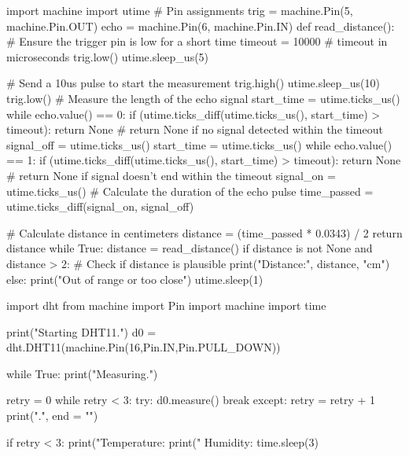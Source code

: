 \documentclass[12pt]{article} %
\begin{document}
\begin{pythoncode}[caption={HCSR04 Ultrasonic Sensor Python Test Code}]
import machine
import utime
# Pin assignments
trig = machine.Pin(5, machine.Pin.OUT)
echo = machine.Pin(6, machine.Pin.IN)
def read_distance():
    # Ensure the trigger pin is low for a short time
    timeout = 10000  # timeout in microseconds
    trig.low()
    utime.sleep_us(5)

    # Send a 10us pulse to start the measurement
    trig.high()
    utime.sleep_us(10)
    trig.low()
    # Measure the length of the echo signal
    start_time = utime.ticks_us()
    while echo.value() == 0:
        if (utime.ticks_diff(utime.ticks_us(), start_time) > timeout):
            return None  # return None if no signal detected within the timeout
    signal_off = utime.ticks_us()
    start_time = utime.ticks_us()
    while echo.value() == 1:
        if (utime.ticks_diff(utime.ticks_us(), start_time) > timeout):
            return None  # return None if signal doesn't end within the timeout
    signal_on = utime.ticks_us()
    # Calculate the duration of the echo pulse
    time_passed = utime.ticks_diff(signal_on, signal_off)

    # Calculate distance in centimeters
    distance = (time_passed * 0.0343) / 2
    return distance
while True:
    distance = read_distance()
    if distance is not None and distance > 2:  # Check if distance is plausible
        print("Distance:", distance, "cm")
    else:
        print("Out of range or too close")
    utime.sleep(1)
\end{pythoncode}
\pagebreak
\begin{pythoncode}[caption={DHT-22 Sensor Test Code}]
import dht
from machine import Pin
import machine
import time

print("Starting DHT11.")
d0 = dht.DHT11(machine.Pin(16,Pin.IN,Pin.PULL_DOWN))


while True:
    print("Measuring.")
    
    retry = 0
    while retry < 3:
        try:
            d0.measure()
            break
        except:
            retry = retry + 1
            print(".", end = "")
   
    if retry < 3:
        print("Temperature: %
        print("   Humidity: %
    time.sleep(3)

\end{pythoncode}

\pagebreak
\end{document}
